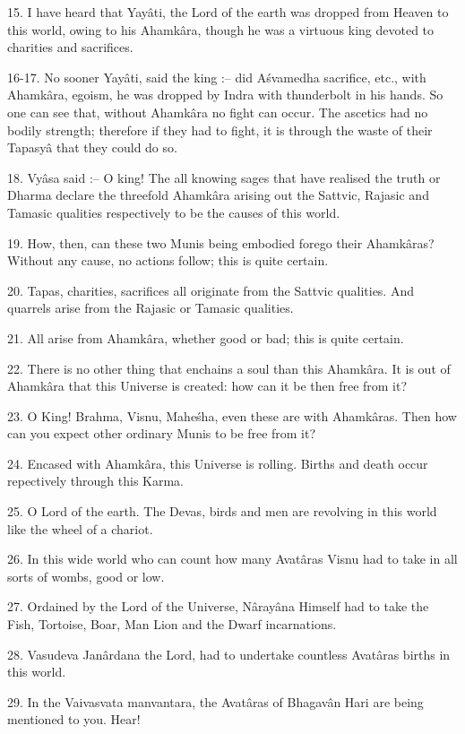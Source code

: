 15. I have heard that Yay\^ati, the Lord of the earth was dropped from Heaven to this world, owing to his Ahamk\^ara, though he was a virtuous king devoted to charities and sacrifices.

16-17. No sooner Yay\^ati, said the king :-- did A\'svamedha sacrifice, etc., with Ahamk\^ara, egoism, he was dropped by Indra with thunderbolt in his hands. So one can see that, without Ahamk\^ara no fight can occur. The ascetics had no bodily strength; therefore if they had to fight, it is through the waste of their Tapasy\^a that they could do so.

18. Vy\^asa said :-- O king! The all knowing sages that have realised the truth or Dharma declare the threefold Ahamk\^ara arising out the Sattvic, Rajasic and Tamasic qualities respectively to be the causes of this world.

19. How, then, can these two Munis being embodied forego their Ahamk\^aras? Without any cause, no actions follow; this is quite certain.

20. Tapas, charities, sacrifices all originate from the Sattvic qualities. And quarrels arise from the Rajasic or Tamasic qualities.

21. All arise from Ahamk\^ara, whether good or bad; this is quite certain.

22. There is no other thing that enchains a soul than this Ahamk\^ara. It is out of Ahamk\^ara that this Universe is created: how can it be then free from it?

23. O King! Brahma, Visnu, Mahe\'sha, even these are with Ahamk\^aras. Then how can you expect other ordinary Munis to be free from it?

24. Encased with Ahamk\^ara, this Universe is rolling. Births and death occur repectively through this Karma.

25. O Lord of the earth. The Devas, birds and men are revolving in this world like the wheel of a chariot.

26. In this wide world who can count how many Avat\^aras Visnu had to take in all sorts of wombs, good or low.

27. Ordained by the Lord of the Universe, N\^aray\^ana Himself had to take the Fish, Tortoise, Boar, Man Lion and the Dwarf incarnations.

28. Vasudeva Jan\^ardana the Lord, had to undertake countless Avat\^aras births in this world.

29. In the Vaivasvata manvantara, the Avat\^aras of Bhagav\^an Hari are being mentioned to you. Hear!

